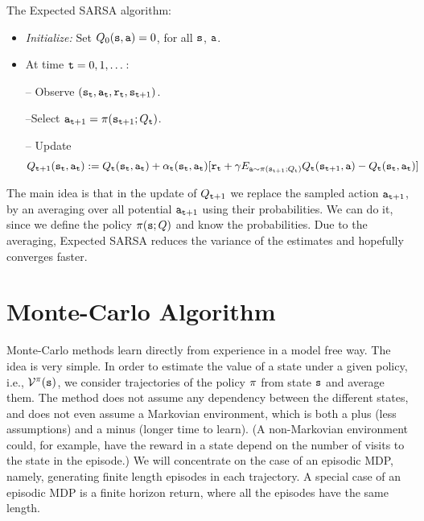 The Expected SARSA algorithm:
\begin{itemize}
\item {\em Initialize:} Set $ Q_0({\tt s},{\tt a})=0$, for all ${\tt s}$, ${\tt a}$.

\item At time ${\tt t}=0,1,\dots$:

-- Observe
$({\tt s}_{\tt t},{\tt a}_{\tt t},{\tt r}_{\tt t},{\tt s}_{{\tt t}+1})$.

--Select ${\tt a}_{{\tt t}+1}=\pi({\tt s}_{{\tt t}+1};Q_{\tt t})$.


-- Update %
\begin{align*}
 Q_{{\tt t}+1}({\tt s}_{\tt t},{\tt a}_{\tt t}) & :=   Q_{\tt t} ({\tt s}_{\tt t},{\tt a}_{\tt t}) + \alpha_{\tt t}({\tt s}_{\tt t},{\tt a}_{\tt t})  [{\tt r}_{\tt t} +
\gamma  E_{{\tt a}\sim \pi({\tt s}_{{\tt t}+1};Q_{\tt t})}
Q_{\tt t} ({\tt s}_{{\tt t}+1}, {\tt a}) -Q_{\tt t}
({\tt s}_{\tt t},{\tt a}_{\tt t})]
\end{align*}

\end{itemize}

The main idea is that in the update of $Q_{{\tt t}+1}$ we replace the
sampled action ${\tt a}_{{\tt t}+1}$, by an averaging over all
potential ${\tt a}_{{\tt t}+1}$ using their probabilities. We can do
it, since we define the policy $\pi({\tt s};Q)$ and know the
probabilities. Due to the averaging, Expected SARSA reduces the
variance of the estimates and hopefully converges faster.

\section{Monte-Carlo Algorithm}
\label{sec:MC}

Monte-Carlo methods learn directly from experience in a model free
way. The idea is very simple. In order to estimate the value of a
state under a given policy, i.e., $\mathcal{V}^\pi({\tt s})$, we
consider trajectories of the policy $\pi$ from state ${\tt s}$
and average them. The method does not assume any dependency between
the different states, and does not even assume a Markovian
environment, which is both a plus (less assumptions) and a minus
(longer time to learn). (A non-Markovian environment could, for
example, have the reward in a state depend on the number of visits
to the state in the episode.) We will concentrate on the case of an
episodic MDP, namely, generating finite length episodes in each
trajectory. A special case of an episodic MDP is a finite horizon
return, where all the episodes have the same length.

